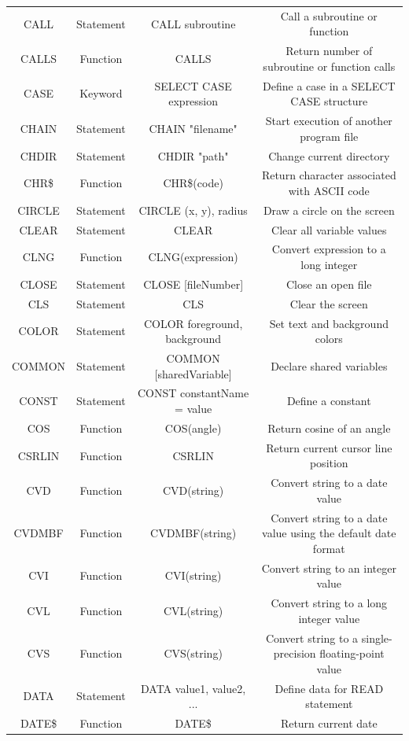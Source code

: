 \documentclass[10pt, reqno]{exam}
\begin{document}
{\begin{longtable}{|c|c|c|c|}
    CALL & Statement & CALL subroutine & Call a subroutine or function \\
    CALLS & Function & CALLS & Return number of subroutine or function calls \\
    CASE & Keyword & SELECT CASE expression & Define a case in a SELECT CASE structure \\
    CHAIN & Statement & CHAIN "filename" & Start execution of another program file \\
    CHDIR & Statement & CHDIR "path" & Change current directory \\
    CHR\$ & Function & CHR\$(code) & Return character associated with ASCII code \\
    CIRCLE & Statement & CIRCLE (x, y), radius & Draw a circle on the screen \\
    CLEAR & Statement & CLEAR & Clear all variable values \\
    CLNG & Function & CLNG(expression) & Convert expression to a long integer \\
    CLOSE & Statement & CLOSE [fileNumber] & Close an open file \\
    CLS & Statement & CLS & Clear the screen \\
    COLOR & Statement & COLOR foreground, background & Set text and background colors \\
    COMMON & Statement & COMMON [sharedVariable] & Declare shared variables \\
    CONST & Statement & CONST constantName = value & Define a constant \\
    COS & Function & COS(angle) & Return cosine of an angle \\
    CSRLIN & Function & CSRLIN & Return current cursor line position \\
    CVD & Function & CVD(string) & Convert string to a date value \\
    CVDMBF & Function & CVDMBF(string) & Convert string to a date value using the default date format \\
    CVI & Function & CVI(string) & Convert string to an integer value \\
    CVL & Function & CVL(string) & Convert string to a long integer value \\
    CVS & Function & CVS(string) & Convert string to a single-precision floating-point value \\
    DATA & Statement & DATA value1, value2, ... & Define data for READ statement \\
    DATE\$ & Function & DATE\$ & Return current date \\

\end{longtable}}
\end{document}
